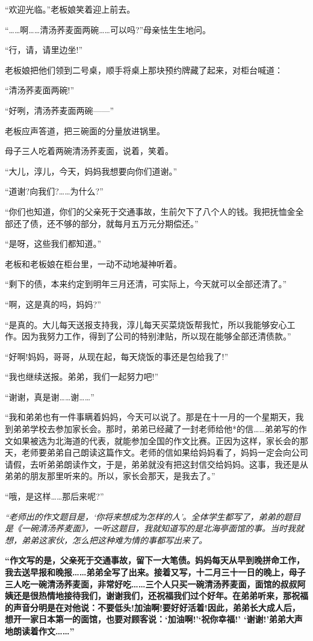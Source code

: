 \documentclass[UTF8,a4paper,8pt]{ctexart}
\begin{document}
 “欢迎光临。”老板娘笑着迎上前去。
 
 “……啊……清汤荞麦面两碗……可以吗?”母亲怯生生地问。
 
 “行，请，请里边坐!”
 
 老板娘把他们领到二号桌，顺手将桌上那块预约牌藏了起来，对柜台喊道：
 
 “清汤荞麦面两碗!”
 
 “好咧，清汤荞麦面两碗——”
 
 老板应声答道，把三碗面的分量放进锅里。
 
 母子三人吃着两碗清汤荞麦面，说着，笑着。
 
 “大儿，淳儿，今天，妈妈我想要向你们道谢。”
 
 “道谢?向我们?……为什么?”
 
 “你们也知道，你们的父亲死于交通事故，生前欠下了八个人的钱。我把抚恤金全部还了债，还不够的部分，就每月五万元分期偿还。”
 
 “是呀，这些我们都知道。”
 
 老板和老板娘在柜台里，一动不动地凝神听着。
 
 “剩下的债，本来约定到明年三月还清，可实际上，今天就可以全部还清了。”
 
 “啊，这是真的吗，妈妈?”
 
 “是真的。大儿每天送报支持我，淳儿每天买菜烧饭帮我忙，所以我能够安心工作。因为我努力工作，得到了公司的特别津贴，所以现在能够全部还清债款。”
 
 “好啊!妈妈，哥哥，从现在起，每天烧饭的事还是包给我了!”
 
 “我也继续送报。弟弟，我们一起努力吧!”
 
 “谢谢，真是谢……谢……”
 
 “我和弟弟也有一件事瞒着妈妈，今天可以说了。那是在十一月的一个星期天，我到弟弟学校去参加家长会。那时，弟弟已经藏了一封老师给他*的信……弟弟写的作文如果被选为北海道的代表，就能参加全国的作文比赛。正因为这样，家长会的那天，老师要弟弟自己朗读这篇作文。老师的信如果给妈妈看了，妈妈一定会向公司请假，去听弟弟朗读作文，于是，弟弟就没有把这封信交给妈妈。这事，我还是从弟弟的朋友那里听来的。所以，家长会那天，是我去了。”
 
 “哦，是这样……那后来呢?”
 
 \textit{ “老师出的作文题目是，‘你将来想成为怎样的人’。全体学生都写了，弟弟的题目是《一碗清汤荞麦面》，一听这题目，我就知道写的是北海亭面馆的事。当时我就想，弟弟这家伙，怎么把这种难为情的事都写出来了。}
 
 \textbf{“作文写的是，父亲死于交通事故，留下一大笔债。妈妈每天从早到晚拼命工作，我去送早报和晚报……弟弟全写了出来。接着又写，十二月三十一日的晚上，母子三人吃一碗清汤荞麦面，非常好吃……三个人只买一碗清汤荞麦面，面馆的叔叔阿姨还是很热情地接待我们，谢谢我们，还祝福我们过个好年。在弟弟听来，那祝福的声音分明是在对他说：不要低头!加油啊!要好好活着!因此，弟弟长大成人后，想开一家日本第一的面馆，也要对顾客说：‘加油啊!’‘祝你幸福!’ ‘谢谢!’弟弟大声地朗读着作文……”}
 
\end{document}
